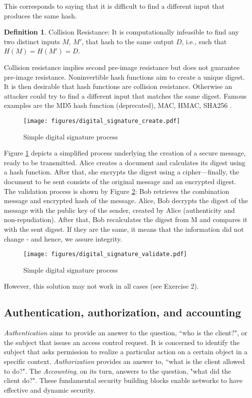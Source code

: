 \documentclass[12pt,a4paper]{article}
\theoremstyle{definition}
\newtheorem{definition}{Definition}[section]
\begin{document}
This corresponds to saying that it is difficult to find a different input that produces the same hash.

\theoremstyle{definition}
\begin{definition}{Collision Resistance:}
It is computationally infeasible to find any two distinct inputs $M$, $M'$, that hash to the same output $D$, i.e., such that $H(M) = H(M') = D$.


\end{definition}

Collision resistance implies second pre-image resistance but does not guarantee pre-image resistance. Noninvertible hash functions aim to create a unique digest. It is then desirable that hash functions are collision resistance. Otherwise an attacker could try to find a different input that matches the same digest. Famous examples are the MD5 hash function (deprecated), MAC, HMAC, SHA256 \cite{conrad2016}.


\begin{figure}[h]
\centering
\texttt{[image: figures/digital\_signature\_create.pdf]}
\caption{Simple digital signature process}
\label{fig:ds_create}
\end{figure}

Figure \ref{fig:ds_create} depicts a simplified process underlying the creation of a secure message, ready to be transmitted. Alice creates a document and calculates its digest using a hash function. After that, she encrypts the digest using a cipher—finally, the document to be sent consists of the original message and an encrypted digest. The validation process is shown by Figure \ref{fig:ds_validate}: Bob retrieves the combination message and encrypted hash of the message. Alice, Bob decrypts the digest of the message with the public key of the sender, created by Alice (authenticity and non-repudiation). After that, Bob recalculates the digest from M and compares it with the sent digest. If they are the same, it means that the information did not change - and hence, we assure integrity.

\begin{figure}[h]
\centering
\texttt{[image: figures/digital\_signature\_validate.pdf]}
\caption{Simple digital signature process}
\label{fig:ds_validate}
\end{figure}

However, this solution may not work in all cases (see Exercise 2).

\subsection{ Authentication, authorization, and accounting}
\emph{Authentication} aims to provide an answer to the question, ``who is the client?", or the subject that issues an access control request. It is concerned to identify the subject that asks permission to realize a particular action on a certain object in a specific context. \emph{Authorization} provides an answer to, ``what is the client allowed to do?". The \emph{Accounting}, on its turn, answers to the question, "what did the client do?". These fundamental security building blocks enable networks to have effective and dynamic security.
\end{document}
